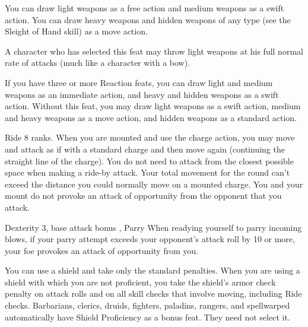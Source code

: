 You can draw light weapons as a free action and medium weapons as a swift action. You can draw heavy weapons and hidden weapons of any type (see the Sleight of Hand skill) as a move action.
\par A character who has selected this feat may throw light weapons at his full normal rate of attacks (much like a character with a bow).

If you have three or more Reaction feats, you can draw light and medium weapons as an immediate action, and heavy and hidden weapons as a swift action.
 Without this feat, you may draw light weapons as a swift action, medium and heavy weapons as a move action, and hidden weapons as a standard action.


\featpre Ride 8 ranks.
 When you are mounted and use the charge action, you may move and attack as if with a standard charge and then move again (continuing the straight line of the charge). You do not need to attack from the closest possible space when making a ride-by attack. Your total movement for the round can't exceed the distance you could normally move on a mounted charge. You and your mount do not provoke an attack of opportunity from the opponent that you attack.

\featpre Dexterity 3, base attack bonus , Parry
\featben When readying yourself to parry incoming blows, if your parry attempt exceeds your opponent's attack roll by 10 or more, your foe provokes an attack of opportunity from you.

 You can use a shield and take only the standard penalties.
 When you are using a shield with which you are not proficient, you take the shield's armor check penalty on attack rolls and on all skill checks that involve moving, including Ride checks.
 Barbarians, clerics, druids, fighters, paladins, rangers, and spellwarped automatically have Shield Proficiency as a bonus feat. They need not select it.

